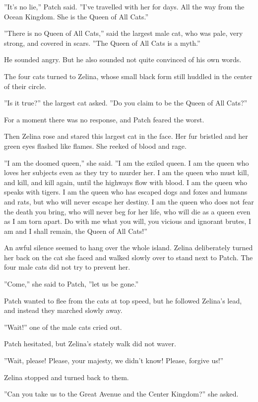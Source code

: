 \documentclass[12pt]{book}
\begin{document}
''It's no lie,'' Patch said. ''I've travelled with her for days. All the way from the Ocean Kingdom. She is the Queen of All Cats.''

''There is no Queen of All Cats,'' said the largest male cat, who was pale, very strong, and covered in scars. ''The Queen of All Cats is a myth.''

He sounded angry. But he also sounded not quite convinced of his own words.

The four cats turned to Zelina, whose small black form still huddled in the center of their circle.

''Is it true?'' the largest cat asked. ''Do you claim to be the Queen of All Cats?''

For a moment there was no response, and Patch feared the worst.

Then Zelina rose and stared this largest cat in the face. Her fur bristled and her green eyes flashed like flames. She reeked of blood and rage.

''I am the doomed queen,'' she said. ''I am the exiled queen. I am the queen who loves her subjects even as they try to murder her. I am the queen who must kill, and kill, and kill again, until the highways flow with blood. I am the queen who speaks with tigers. I am the queen who has escaped dogs and foxes and humans and rats, but who will never escape her destiny. I am the queen who does not fear the death you bring, who will never beg for her life, who will die as a queen even as I am torn apart. Do with me what you will, you vicious and ignorant brutes, I am and I shall remain, the Queen of All Cats!''

An awful silence seemed to hang over the whole island. Zelina deliberately turned her back on the cat she faced and walked slowly over to stand next to Patch. The four male cats did not try to prevent her.

''Come,'' she said to Patch, ''let us be gone.''

Patch wanted to flee from the cats at top speed, but he followed Zelina's lead, and instead they marched slowly away.

''Wait!'' one of the male cats cried out.

Patch hesitated, but Zelina's stately walk did not waver.

''Wait, please! Please, your majesty, we didn't know! Please, forgive us!''

Zelina stopped and turned back to them.

''Can you take us to the Great Avenue and the Center Kingdom?'' she asked.
\end{document}
